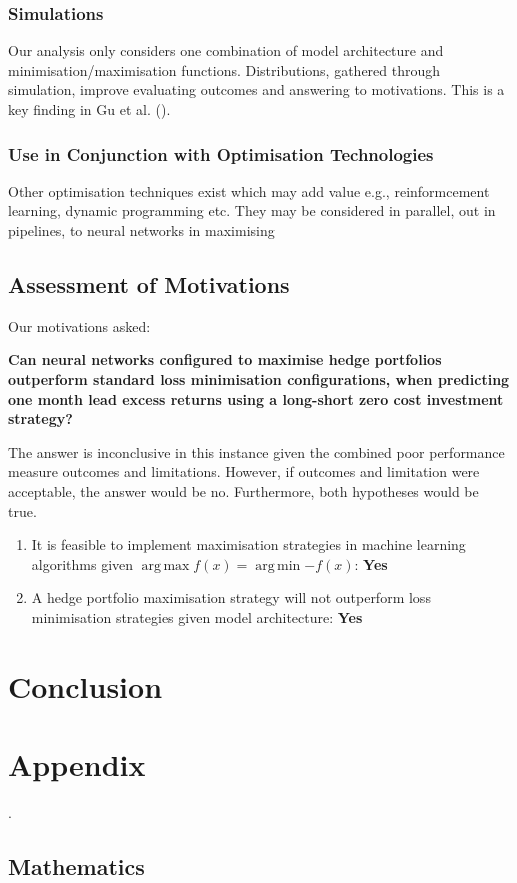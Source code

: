 \documentclass[12pt]{article}
\DeclareMathOperator*{\argmax}{arg\,max}
\DeclareMathOperator*{\argmin}{arg\,min} %
\begin{document}
\subsubsection*{Simulations}
Our analysis only considers one combination of model architecture and minimisation/maximisation functions.
Distributions, gathered through simulation, improve evaluating outcomes and answering to motivations.
This is a key finding in Gu et al. (\citeyear{eapvml}).
\subsubsection{Use in Conjunction with Optimisation Technologies}
Other optimisation techniques exist which may add value e.g., reinformcement learning, dynamic programming etc.
They may be considered in parallel, out in pipelines, to neural networks in maximising
\subsection{Assessment of Motivations}
Our motivations asked:
\begin{center}
	\textbf{Can neural networks configured to maximise hedge portfolios outperform standard loss minimisation configurations,
	when predicting one month lead excess returns using a long-short zero cost investment strategy?}
\end{center}
The answer is inconclusive in this instance given the combined poor performance measure outcomes and limitations.
However, if outcomes and limitation were acceptable, the answer would be no.
Furthermore, both hypotheses would be true.
\singlespacing
\begin{enumerate}
	\item It is feasible to implement maximisation strategies in machine learning algorithms given $\argmax{f(x)}=\argmin{-f(x)}$: \textbf{Yes}
	\item A hedge portfolio maximisation strategy will not outperform loss minimisation strategies given model architecture: \textbf{Yes}
\end{enumerate}
\newpage
\section{Conclusion} \label{conclusion}
\newpage
\printbibliography
\newpage
\section{Appendix} \label{appendix}.
\subsection{Mathematics}
\end{document}
